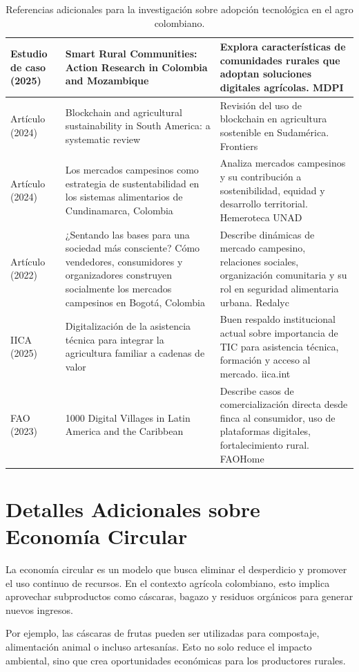 \begin{table}[htbp]
{\begin{tabular}{@{}p{}p{}p{}@{}}
\midrule
Estudio de caso (2025) & Smart Rural Communities: Action Research in Colombia and Mozambique & Explora características de comunidades rurales que adoptan soluciones digitales agrícolas. MDPI \\
\midrule
Artículo (2024) & Blockchain and agricultural sustainability in South America: a systematic review & Revisión del uso de blockchain en agricultura sostenible en Sudamérica. Frontiers \\
\midrule
Artículo (2024) & Los mercados campesinos como estrategia de sustentabilidad en los sistemas alimentarios de Cundinamarca, Colombia & Analiza mercados campesinos y su contribución a sostenibilidad, equidad y desarrollo territorial. Hemeroteca UNAD \\
\midrule
Artículo (2022) & ¿Sentando las bases para una sociedad más consciente? Cómo vendedores, consumidores y organizadores construyen socialmente los mercados campesinos en Bogotá, Colombia & Describe dinámicas de mercado campesino, relaciones sociales, organización comunitaria y su rol en seguridad alimentaria urbana. Redalyc \\
\midrule
IICA (2025) & Digitalización de la asistencia técnica para integrar la agricultura familiar a cadenas de valor & Buen respaldo institucional actual sobre importancia de TIC para asistencia técnica, formación y acceso al mercado. iica.int \\
\midrule
FAO (2023) & 1000 Digital Villages in Latin America and the Caribbean & Describe casos de comercialización directa desde finca al consumidor, uso de plataformas digitales, fortalecimiento rural. FAOHome \\
\bottomrule
\end{tabular}
}
\caption{Referencias adicionales para la investigación sobre adopción tecnológica en el agro colombiano.}
\label{tab:referencias_adicionales}
\end{table}

\section{Detalles Adicionales sobre Economía Circular}

La economía circular es un modelo que busca eliminar el desperdicio y promover el uso continuo de recursos. En el contexto agrícola colombiano, esto implica aprovechar subproductos como cáscaras, bagazo y residuos orgánicos para generar nuevos ingresos.

Por ejemplo, las cáscaras de frutas pueden ser utilizadas para compostaje, alimentación animal o incluso artesanías. Esto no solo reduce el impacto ambiental, sino que crea oportunidades económicas para los productores rurales.

